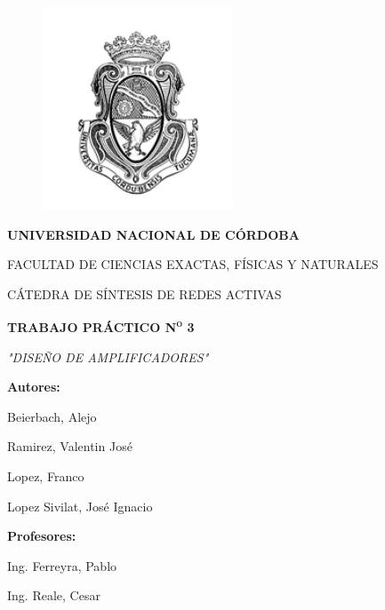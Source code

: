 \documentclass[a4paper,12pt]{article}
\begin{document}
\begin{titlepage}
    \noindent
    \begin{figure}
        \centering
        \includegraphics[width=0.4\linewidth]{Logo UNC.png}
    \end{figure}
    \begin{center}
        {\scshape\Large\textbf{UNIVERSIDAD NACIONAL DE C\'ORDOBA} \par}
        \vspace{0.5cm}
        {\large{FACULTAD DE CIENCIAS EXACTAS, F\'ISICAS Y NATURALES} \par}
        \vspace{0.5cm}
        {\large{C\'ATEDRA DE S\'INTESIS DE REDES ACTIVAS} \par}
        \vspace{2cm}
        {\scshape\Huge \textbf{TRABAJO PR\'ACTICO N\textsuperscript{o} 3} \par}
        \vspace{2cm}
        {\itshape\Large "DISE\~NO DE AMPLIFICADORES" \par}
        \vspace{3cm}
        \vfill
        \begin{minipage}[t]{8cm}
            {\Large \textbf{Autores:} \par}
            {\Large Beierbach, Alejo \par}
            {\Large Ramirez, Valentin José \par}
            {\Large Lopez, Franco \par}
            {\Large Lopez Sivilat, José Ignacio \par}
        \end{minipage}\hfill\begin{minipage}[t]{8cm}
            \begin{flushright}
                {\Large \textbf{Profesores:} \par}
                {\Large Ing. Ferreyra, Pablo\par}
                {\Large Ing. Reale, Cesar\par}
            \end{flushright}
        \end{minipage}
        \vspace{1cm}
    \end{center}
\end{titlepage}
\end{document}
